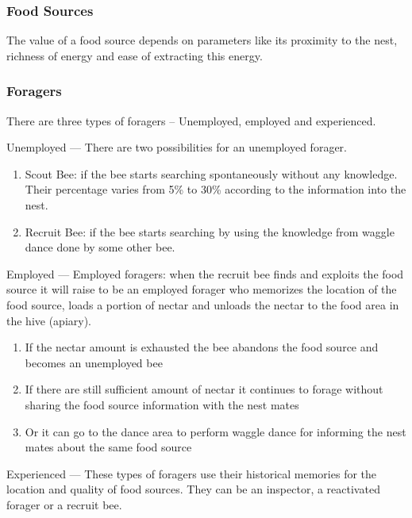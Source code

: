\documentclass[pdftex,11pt]{article}
\begin{document}
\subsubsection{Food Sources}
The value of a food source depends on parameters like its proximity to the nest, richness of energy and ease of extracting this energy.
\subsubsection{Foragers}
There are three types of foragers -- Unemployed, employed and experienced.
\begin{description}
\item{Unemployed} --- There are two possibilities for an unemployed forager.
	\begin{enumerate}
	\item Scout Bee: if the bee starts searching spontaneously without any knowledge. Their percentage varies from 5\% to 30\% according to the information into the nest.
	\item Recruit Bee: if the bee starts searching by using the knowledge from waggle dance done by some other bee.
	\end{enumerate}
\item {Employed} --- Employed foragers: when the recruit bee finds and exploits the food source it will raise to be an employed forager who memorizes the location of the food source, loads a portion of nectar and unloads the nectar to the food area in the hive (apiary).
	\begin{enumerate}
	\item If the nectar amount is exhausted the bee abandons the food source and becomes an unemployed bee
	\item If there are still sufficient amount of nectar it continues to forage without sharing the food source information with the nest mates
	\item Or it can go to the dance area to perform  waggle dance for informing the nest mates about the same food source 
	\end{enumerate}
\item{Experienced} --- These types of foragers use  their historical memories for the location and quality of food sources. They can be an inspector, a reactivated forager or a recruit bee.
\end{description}
\end{document}

